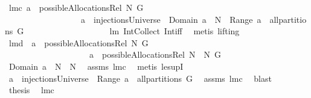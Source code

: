 \begin{isabellebody}
{\isafoldproof}%
%
\isadelimproof
\isanewline
%
\endisadelimproof
\isanewline
{}\isamarkupfalse%
\ lm{}{}c{\isacharcolon}\ {\isachardoublequoteopen}a\ {\isasymin}\ possibleAllocationsRel\ N\ G\ {\isacharequal}\ \isanewline
\ \ \ \ \ \ \ \ \ \ \ \ \ \ \ \ \ \ {\isacharparenleft}a\ {\isasymin}\ injectionsUniverse\ {\isacharampersand}\ Domain\ a\ {\isasymsubseteq}\ N\ {\isacharampersand}\ Range\ a\ {\isasymin}\ all{\isacharunderscore}partitions\ G{\isacharparenright}{\isachardoublequoteclose}\ \isanewline
%
\isadelimproof
\ \ \ \ \ \ \ \ \ \ \ \ \ \ \ \ \ %
\endisadelimproof
%
\isatagproof
{}\isamarkupfalse%
\ lm{}{}\ Int{\isacharunderscore}Collect\ Int{\isacharunderscore}iff\ \isamarkupfalse%
\ {\isacharparenleft}metis\ {\isacharparenleft}lifting{\isacharparenright}{\isacharparenright}%
\endisatagproof
{\isafoldproof}%
%
\isadelimproof
\isanewline
%
\endisadelimproof
\isanewline
{}\isamarkupfalse%
\ lm{}{}d{\isacharcolon}\ \ {\isachardoublequoteopen}a\ {\isasymin}\ possibleAllocationsRel\ N{}\ G{\isachardoublequoteclose}\ \isanewline
\ \ \ \ \ \ \ \ \ \ \ \ \ \ \ \ \ \ \ \ {\isachardoublequoteopen}a\ {\isasymin}\ possibleAllocationsRel\ {\isacharparenleft}N{}\ {\isasymunion}\ N{}{\isacharparenright}\ G{\isachardoublequoteclose}\isanewline
%
\isadelimproof
%
\endisadelimproof
%
\isatagproof
{}\isamarkupfalse%
\ {\isacharminus}\ \isanewline
{}\isamarkupfalse%
\ {\isachardoublequoteopen}Domain\ a\ {\isasymsubseteq}\ N{}\ {\isasymunion}\ N{}{\isachardoublequoteclose}\ \isamarkupfalse%
\ assms{\isacharparenleft}{}{\isacharparenright}\ lm{}{}c\ \isamarkupfalse%
\ {\isacharparenleft}metis\ le{\isacharunderscore}supI{}{\isacharparenright}\ \isanewline
{}\isamarkupfalse%
\ \isamarkupfalse%
\ {\isachardoublequoteopen}a\ {\isasymin}\ injectionsUniverse\ {\isacharampersand}\ Range\ a\ {\isasymin}\ all{\isacharunderscore}partitions\ G{\isachardoublequoteclose}\ \isanewline
{}\isamarkupfalse%
\ assms\ lm{}{}c\ \isamarkupfalse%
\ blast\ \isamarkupfalse%
\ \isamarkupfalse%
\ {\isacharquery}thesis\ \isamarkupfalse%
\ lm{}{}c\ \isamarkupfalse%

\end{isabellebody}
